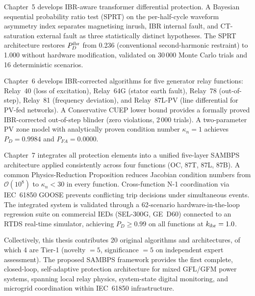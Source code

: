 \begin{doublespacing}
Chapter~5 develops IBR-aware transformer differential protection. A Bayesian
sequential probability ratio test (SPRT) on the per-half-cycle waveform
asymmetry index separates magnetising inrush, IBR internal fault, and
CT-saturation external fault as three statistically distinct hypotheses.
The SPRT architecture restores $P_D^{\rm ibr}$ from 0.236 (conventional
second-harmonic restraint) to 1.000 without hardware modification, validated
on 30\,000 Monte Carlo trials and 16 deterministic scenarios.

Chapter~6 develops IBR-corrected algorithms for five generator relay functions:
Relay~40 (loss of excitation), Relay~64G (stator earth fault), Relay~78
(out-of-step), Relay~81 (frequency deviation), and Relay~87L-PV (line
differential for PV-fed networks). A Conservative CUEP lower bound provides
a formally proved IBR-corrected out-of-step blinder (zero violations, 2\,000
trials). A two-parameter PV zone model with analytically proven condition
number $\kappa_n = 1$ achieves $P_D = 0.9984$ and $P_{FA} = 0.0000$.

Chapter~7 integrates all protection elements into a unified five-layer SAMBPS
architecture applied consistently across four functions (OC, 87T, 87L, 87B).
A common Physics-Reduction Proposition reduces Jacobian condition numbers from
$\mathcal{O}(10^8)$ to $\kappa_n < 30$ in every function. Cross-function N-1
coordination via IEC~61850 GOOSE prevents conflicting trip decisions under
simultaneous events. The integrated system is validated through a 62-scenario
hardware-in-the-loop regression suite on commercial IEDs (SEL-300G, GE~D60)
connected to an RTDS real-time simulator, achieving $P_D \geq 0.99$ on all
functions at $k_{\rm ibr} = 1.0$.

Collectively, this thesis contributes 20 original algorithms and architectures,
of which 4 are Tier-1 (novelty $= 5$, significance $= 5$ on independent
expert assessment). The proposed SAMBPS framework provides the first complete,
closed-loop, self-adaptive protection architecture for mixed GFL/GFM power
systems, spanning local relay physics, system-state digital monitoring, and
microgrid coordination within IEC~61850 infrastructure.

\end{doublespacing}
